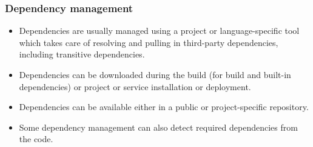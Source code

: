 \documentclass[aspectratio=169]{beamer}              %
\begin{document}
\begin{frame}
	\frametitle{Dependency management}
	
	\begin{block}{}
		\begin{itemize}
			\item Dependencies are usually managed using a project or language-specific tool which takes care of resolving and pulling in third-party dependencies, including transitive dependencies.
			\item Dependencies can be downloaded during the build (for build and built-in dependencies) or project or service installation or deployment.
			\item Dependencies can be available either in a public or project-specific repository.
			\item Some dependency management can also detect required dependencies from the code.
		\end{itemize}
	\end{block}
\end{frame}
\end{document}
